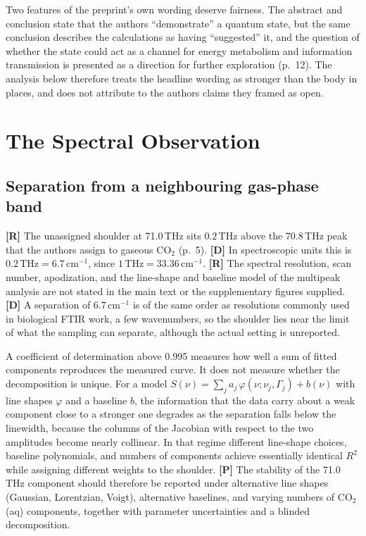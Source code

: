 \documentclass[11pt]{article}
\newcommand{\stR}{\textbf{\textcolor{blue!55!black}{[R]}}}
\newcommand{\stD}{\textbf{\textcolor{green!40!black}{[D]}}}
\newcommand{\stP}{\textbf{\textcolor{violet!80!black}{[P]}}}
\newcommand{\thz}{\,\mathrm{THz}}
\newcommand{\cmi}{\,\mathrm{cm^{-1}}}
\theoremstyle{plain}
\theoremstyle{definition}
\theoremstyle{remark}
\begin{document}
Two features of the preprint's own wording deserve fairness. The abstract and conclusion state that the authors ``demonstrate'' a quantum state, but the same conclusion describes the calculations as having ``suggested'' it, and the question of whether the state could act as a channel for energy metabolism and information transmission is presented as a direction for further exploration (p.~12). The analysis below therefore treats the headline wording as stronger than the body in places, and does not attribute to the authors claims they framed as open.

\section{The Spectral Observation}
\label{sec:obs}

\subsection{Separation from a neighbouring gas-phase band}

\stR{} The unassigned shoulder at 71.0\,THz sits $0.2\thz$ above the 70.8\,THz peak that the authors assign to gaseous CO$_2$ (p.~5). \stD{} In spectroscopic units this is $0.2\thz = 6.7\cmi$, since $1\thz = 33.36\cmi$. \stR{} The spectral resolution, scan number, apodization, and the line-shape and baseline model of the multipeak analysis are not stated in the main text or the supplementary figures supplied. \stD{} A separation of $6.7\cmi$ is of the same order as resolutions commonly used in biological FTIR work, a few wavenumbers, so the shoulder lies near the limit of what the sampling can separate, although the actual setting is unreported.

A coefficient of determination above 0.995 measures how well a sum of fitted components reproduces the measured curve. It does not measure whether the decomposition is unique. For a model $S(\nu)=\sum_j a_j\,\varphi(\nu;\nu_j,\Gamma_j)+b(\nu)$ with line shapes $\varphi$ and a baseline $b$, the information that the data carry about a weak component close to a stronger one degrades as the separation falls below the linewidth, because the columns of the Jacobian with respect to the two amplitudes become nearly collinear. In that regime different line-shape choices, baseline polynomials, and numbers of components achieve essentially identical $R^2$ while assigning different weights to the shoulder. \stP{} The stability of the 71.0\,THz component should therefore be reported under alternative line shapes (Gaussian, Lorentzian, Voigt), alternative baselines, and varying numbers of CO$_2$(aq) components, together with parameter uncertainties and a blinded decomposition.
\end{document}
